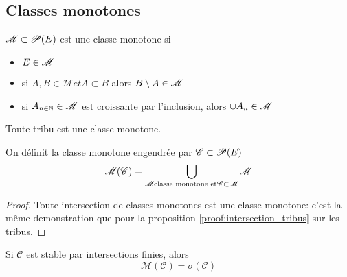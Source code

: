 \subsection{Classes monotones}

\begin{definition}
	$\mathscr{M} \subset \mathscr{P}(E)$ est une classe monotone si
	\begin{itemize}
		\item $E\in \mathscr{M}$
		\item si $A,B \in \mathscr{M} et A \subset B$ alors $B\setminus A \in \mathscr{M}$
		\item si $A_{n\in\mathbb{N}} \in \mathscr{M}$ est croissante par l'inclusion, alors $\cup A_n \in \mathscr{M}$
	\end{itemize}
\end{definition}

\begin{remarque}
	Toute tribu est une classe monotone.
\end{remarque}

\begin{definition}
	On définit la classe monotone engendrée par $\mathscr{C} \subset \mathscr{P}(E)$
	$$ \mathscr{M}(\mathscr{C}) = \bigcup\limits_{\mathscr{M} \text{classe monotone et} \mathscr{C} \subset \mathscr{M}} \mathscr{M} $$
\end{definition}

\begin{proof}
	Toute intersection de classes monotones est une classe monotone: c'est la même demonstration que pour la proposition \ref{proof:intersection_tribus} sur les tribus.
\end{proof}

\begin{theorem}
	Si $\mathscr{C}$ est stable par intersections finies, alors
	$$ \mathscr{M}(\mathscr{C}) = \sigma(\mathscr{C}) $$
\end{theorem}


